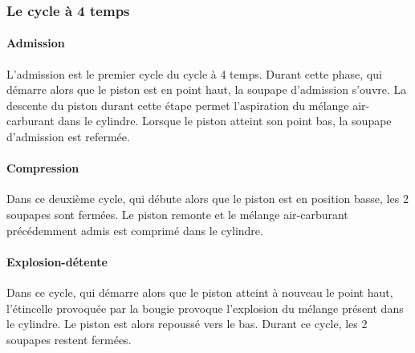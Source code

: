 		\subsubsection{Le cycle à 4 temps}
		\renewcommand{\echelleTikz}{0.5}
		\paragraph{Admission}
		
		L'admission est le premier cycle du cycle à 4 temps. Durant cette phase, qui démarre alors que le piston est en point haut, la soupape d'admission s'ouvre. La descente du piston durant cette étape permet l'aspiration du mélange air-carburant dans le cylindre. Lorsque le piston atteint son point bas, la soupape d'admission est refermée.

		\begin{figure}[H]
  		\centering
    		
		\end{figure}	

		\paragraph{Compression}
		
		Dans ce deuxième cycle, qui débute alors que le piston est en position basse, les 2 soupapes sont fermées. Le piston remonte et le mélange air-carburant précédemment admis est comprimé dans le cylindre.
		
		\begin{figure}[H]
  		\centering
    		
		\end{figure}	
		
		\paragraph{Explosion-détente}
		
		Dans ce cycle, qui démarre alors que le piston atteint à nouveau le point haut, l'étincelle provoquée par la bougie provoque l'explosion du mélange présent dans le cylindre. Le piston est alors repoussé vers le bas. Durant ce cycle, les 2 soupapes restent fermées.
		
		\begin{figure}[H]
  		\centering
		
		\end{figure}	
		
